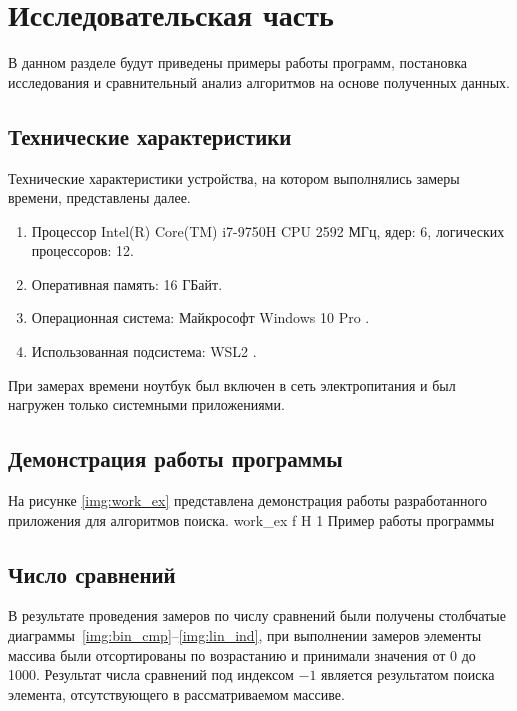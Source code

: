 \chapter{Исследовательская часть}

В данном разделе будут приведены примеры работы программ, постановка исследования и сравнительный анализ алгоритмов на основе полученных данных.


\section{Технические характеристики}

Технические характеристики устройства, на котором выполнялись замеры времени, представлены далее.

\begin{enumerate}
	\item Процессор	Intel(R) Core(TM) i7-9750H CPU 2592 МГц, ядер: 6, логических процессоров: 12.
	\item Оперативная память: 16 ГБайт.
	\item Операционная система: Майкрософт Windows 10 Pro \cite{windows}.
	\item Использованная подсистема: WSL2 \cite{WSL2}.
\end{enumerate}

При замерах времени ноутбук был включен в сеть электропитания и был нагружен только системными приложениями.



\section{Демонстрация работы программы}

На рисунке \ref{img:work_ex} представлена демонстрация работы разработанного приложения для алгоритмов поиска.
{work_ex} %
{f} %
{H} %
{1\textwidth} %
{Пример работы программы} %



\section{Число сравнений}

В результате проведения замеров по числу сравнений были получены столбчатые диаграммы~\ref{img:bin_cmp}--\ref{img:lin_ind}, при выполнении замеров элементы массива были отсортированы по возрастанию и принимали значения от 0 до 1000. Результат числа сравнений под индексом $-1$ является результатом поиска элемента, отсутствующего в рассматриваемом массиве.

